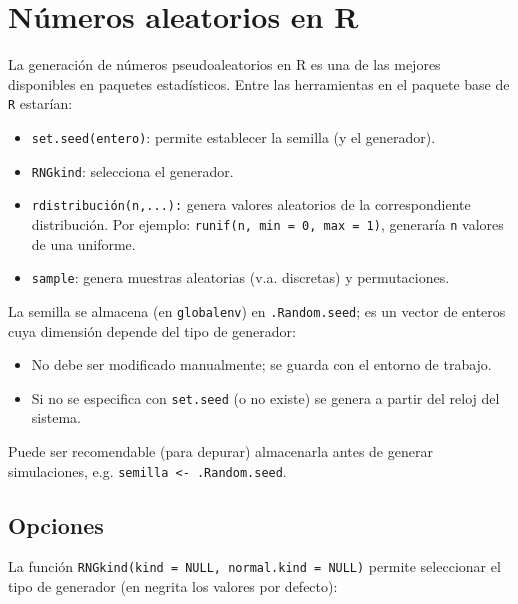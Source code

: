 \documentclass[]{book}
\theoremstyle{definition}
\theoremstyle{definition}
\theoremstyle{definition}
\theoremstyle{remark}
\let\BeginKnitrBlock\begin \let\EndKnitrBlock\end
\begin{document}
\chapter{Números aleatorios en R}\label{numeros-aleatorios-en-r}

La generación de números pseudoaleatorios en R es una de las mejores
disponibles en paquetes estadísticos. Entre las herramientas en el
paquete base de \texttt{R} estarían:

\begin{itemize}
\item
  \texttt{set.seed(entero)}: permite establecer la semilla (y el
  generador).
\item
  \texttt{RNGkind}: selecciona el generador.
\item
  \texttt{rdistribución(n,...):} genera valores aleatorios de la
  correspondiente distribución. Por ejemplo:
  \texttt{runif(n,\ min\ =\ 0,\ max\ =\ 1)}, generaría \texttt{n}
  valores de una uniforme.
\item
  \texttt{sample}: genera muestras aleatorias (v.a. discretas) y
  permutaciones.
\end{itemize}

La semilla se almacena (en \texttt{globalenv}) en \texttt{.Random.seed};
es un vector de enteros cuya dimensión depende del tipo de generador:

\begin{itemize}
\item
  No debe ser modificado manualmente; se guarda con el entorno de
  trabajo.
\item
  Si no se especifica con \texttt{set.seed} (o no existe) se genera a
  partir del reloj del sistema.
\end{itemize}

\BeginKnitrBlock{remark}
{}Puede ser recomendable (para depurar)
almacenarla antes de generar simulaciones, e.g.
\texttt{semilla\ \textless{}-\ .Random.seed}.
\EndKnitrBlock{remark}

\section{Opciones}\label{opciones}

La función \texttt{RNGkind(kind\ =\ NULL,\ normal.kind\ =\ NULL)}
permite seleccionar el tipo de generador (en negrita los valores por
defecto):
\end{document}

